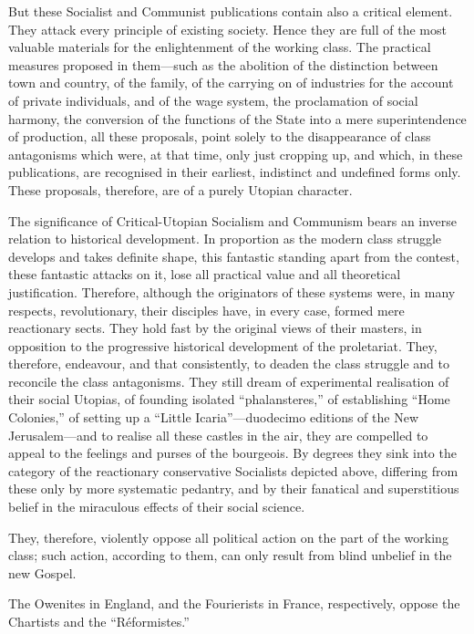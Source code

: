 But these Socialist and Communist publications contain also a critical
element. They attack every principle of existing society. Hence they
are full of the most valuable materials for the enlightenment of the
working class. The practical measures proposed in them—such as the
abolition of the distinction between town and country, of the family,
of the carrying on of industries for the account of private
individuals, and of the wage system, the proclamation of social
harmony, the conversion of the functions of the State into a mere
superintendence of production, all these proposals, point solely to the
disappearance of class antagonisms which were, at that time, only just
cropping up, and which, in these publications, are recognised in their
earliest, indistinct and undefined forms only. These proposals,
therefore, are of a purely Utopian character.

The significance of Critical-Utopian Socialism and Communism bears an
inverse relation to historical development. In proportion as the modern
class struggle develops and takes definite shape, this fantastic
standing apart from the contest, these fantastic attacks on it, lose
all practical value and all theoretical justification. Therefore,
although the originators of these systems were, in many respects,
revolutionary, their disciples have, in every case, formed mere
reactionary sects. They hold fast by the original views of their
masters, in opposition to the progressive historical development of the
proletariat. They, therefore, endeavour, and that consistently, to
deaden the class struggle and to reconcile the class antagonisms. They
still dream of experimental realisation of their social Utopias, of
founding isolated \enquote{phalansteres,} of establishing \enquote{Home Colonies,} of
setting up a \enquote{Little Icaria}—duodecimo editions of the New
Jerusalem—and to realise all these castles in the air, they are
compelled to appeal to the feelings and purses of the bourgeois. By
degrees they sink into the category of the reactionary conservative
Socialists depicted above, differing from these only by more systematic
pedantry, and by their fanatical and superstitious belief in the
miraculous effects of their social science.

They, therefore, violently oppose all political action on the part of
the working class; such action, according to them, can only result from
blind unbelief in the new Gospel.

The Owenites in England, and the Fourierists in France, respectively,
oppose the Chartists and the \enquote{Réformistes.}



